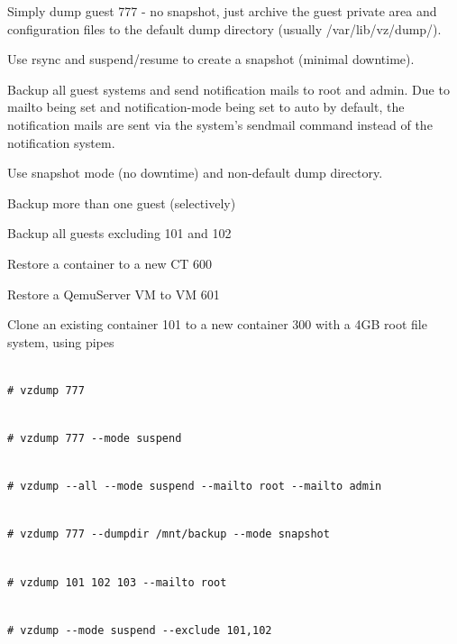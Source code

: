 Simply dump guest 777 - no snapshot, just archive the guest private area and configuration files to the default dump directory (usually /var/lib/vz/dump/).

Use rsync and suspend/resume to create a snapshot (minimal downtime).

Backup all guest systems and send notification mails to root and admin. Due to mailto being set and notification-mode being set to auto by default, the notification mails are sent via the system’s sendmail command instead of the notification system.

Use snapshot mode (no downtime) and non-default dump directory.

Backup more than one guest (selectively)

Backup all guests excluding 101 and 102

Restore a container to a new CT 600

Restore a QemuServer VM to VM 601

Clone an existing container 101 to a new container 300 with a 4GB root file system, using pipes

\begin{lstlisting}

# vzdump 777

\end{lstlisting}

\begin{lstlisting}

# vzdump 777 --mode suspend

\end{lstlisting}

\begin{lstlisting}

# vzdump --all --mode suspend --mailto root --mailto admin

\end{lstlisting}

\begin{lstlisting}

# vzdump 777 --dumpdir /mnt/backup --mode snapshot

\end{lstlisting}

\begin{lstlisting}

# vzdump 101 102 103 --mailto root

\end{lstlisting}

\begin{lstlisting}

# vzdump --mode suspend --exclude 101,102

\end{lstlisting}

